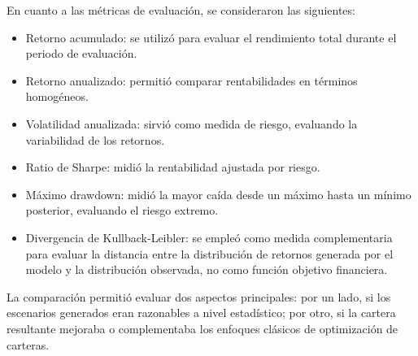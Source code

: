 En cuanto a las métricas de evaluación, se consideraron las siguientes:

\begin{itemize}
\item Retorno acumulado: se utilizó para evaluar el rendimiento total durante el periodo de evaluación.
\item Retorno anualizado: permitió comparar rentabilidades en términos homogéneos.
\item Volatilidad anualizada: sirvió como medida de riesgo, evaluando la variabilidad de los retornos.
\item Ratio de Sharpe: midió la rentabilidad ajustada por riesgo.
\item Máximo drawdown: midió la mayor caída desde un máximo hasta un mínimo posterior, evaluando el riesgo extremo.
\item Divergencia de Kullback-Leibler: se empleó como medida complementaria para evaluar la distancia entre la distribución de retornos generada por el modelo y la distribución observada, no como función objetivo financiera.
\end{itemize}

La comparación permitió evaluar dos aspectos principales: por un lado, si los escenarios generados eran razonables a nivel estadístico; por otro, si la cartera resultante mejoraba o complementaba los enfoques clásicos de optimización de carteras.
